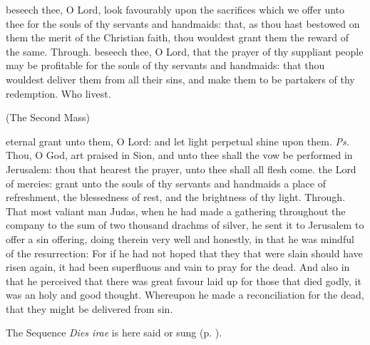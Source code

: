 \secret
{} beseech thee, O Lord, look favourably upon the sacrifices which we offer unto thee for the souls of thy servants and handmaids: that, as thou hast bestowed on them the merit of the Christian faith, thou wouldest grant them the reward of the same. Through.
\postcommunion
{} beseech thee, O Lord, that the prayer of thy suppliant people may be profitable for the souls of thy servants and handmaids: that thou wouldest deliver them from all their sins, and make them to be partakers of thy redemption. Who livest.
\centerline{\small{(The Second Mass)}}\label{AllSoulsII}
\par
\introit
{} eternal grant unto them, O Lord: and let light perpetual shine upon them. \textit{Ps.} Thou, O God, art praised in Sion, and unto thee shall the vow be performed in Jerusalem: thou that hearest the prayer, unto thee shall all flesh come.
\collect
{} the Lord of mercies: grant unto the souls of thy servants and handmaids a place of refreshment, the blessedness of rest, and the brightness of thy light. Through.
 That most valiant man Judas, when he had made a gathering throughout the company to the sum of two thousand drachms of silver, he sent it to Jerusalem to offer a sin offering, doing therein very well and honestly, in that he was mindful of the resurrection: For if he had not hoped that they that were slain should have risen again, it had been superfluous and vain to pray for the dead. And also in that he perceived that there was great favour laid up for those that died godly, it was an holy and good thought. Whereupon he made a reconciliation for the dead, that they might be delivered from sin.
\begin{rubric}
    The Sequence \emph{Dies irae} is here said or sung (p. \pageref{diesirae}).
\end{rubric}
